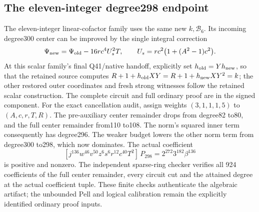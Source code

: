 \subsection{The eleven-integer degree298 endpoint}
The eleven-integer linear-cofactor family uses the same new
$k,\mathcal B_6$. Its incoming degree300 center can be improved by the
single integral correction
\[
 \Psi_{\rm new}=\Psi_{\rm old}-16rc^4U_s^2T,
 \qquad U_s=rc^2\bigl(1+(A^2-1)c^2\bigr).
\]
At this scalar family's final Q41/native handoff, explicitly set
$h_{\rm old}=Yh_{\rm new}$, so that the retained source computes
$R+1+h_{\rm old}XY=R+1+h_{\rm new}XY^2=k$; the other restored outer
coordinates and fresh strong witnesses follow the retained scalar
construction.
The complete circuit and full ordinary proof are in the signed component.
For the exact cancellation audit, assign weights $(3,1,1,1,5)$ to
$(A,c,r,T,R)$. The pre-auxiliary center remainder drops from degree82 to80,
and the full center remainder from110 to108. The norm's squared inner
term consequently has degree296. The weaker budget lowers the other
norm term from degree300 to298, which now dominates. The actual
coefficient
\[
 [j^{136}w^{46}v^{50}z^6s^6r^{12}c^{40}T^2]\,P_{298}
       =2^{272}3^{182}\beta^{136}
\]
is positive and nonzero. The independent sparse-ring checker verifies all
924 coefficients of the full center remainder, every circuit cut and the
attained degree at the actual coefficient tuple. These finite checks
authenticate the algebraic artifact; the unbounded Pell and logical
calibration remain the explicitly identified ordinary proof inputs.

